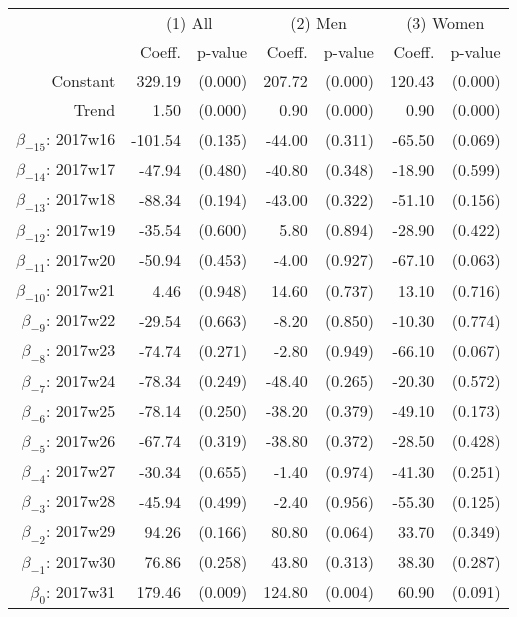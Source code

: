 \begin{threeparttable}
\begin{tabular}{@{}r|rr|rr|rr@{}} \hline\hline
 & \multicolumn{2}{c|}{(1) All} & \multicolumn{2}{c|}{(2) Men} &  \multicolumn{2}{c}{(3) Women} \\ 
 & Coeff. & p-value  & Coeff. & p-value & Coeff. & p-value \\ \hline
 Constant & 329.19  & (0.000) & 207.72  & (0.000)  & 120.43  & (0.000) \\ 
 Trend &  1.50  & (0.000) &  0.90  & (0.000)  &  0.90  & (0.000) \\ 
 $ \beta_{-15} $: 2017w16 & -101.54  & (0.135) & -44.00  & (0.311)  & -65.50  & (0.069) \\ 
 $ \beta_{-14} $: 2017w17 & -47.94  & (0.480) & -40.80  & (0.348)  & -18.90  & (0.599) \\ 
 $ \beta_{-13} $: 2017w18 & -88.34  & (0.194) & -43.00  & (0.322)  & -51.10  & (0.156) \\ 
 $ \beta_{-12} $: 2017w19 & -35.54  & (0.600) &  5.80  & (0.894)  & -28.90  & (0.422) \\ 
 $ \beta_{-11} $: 2017w20 & -50.94  & (0.453) & -4.00  & (0.927)  & -67.10  & (0.063) \\ 
 $ \beta_{-10} $: 2017w21 &  4.46  & (0.948) & 14.60  & (0.737)  & 13.10  & (0.716) \\ 
 $ \beta_{-9} $: 2017w22 & -29.54  & (0.663) & -8.20  & (0.850)  & -10.30  & (0.774) \\ 
 $ \beta_{-8} $: 2017w23 & -74.74  & (0.271) & -2.80  & (0.949)  & -66.10  & (0.067) \\ 
 $ \beta_{-7} $: 2017w24 & -78.34  & (0.249) & -48.40  & (0.265)  & -20.30  & (0.572) \\ 
 $ \beta_{-6} $: 2017w25 & -78.14  & (0.250) & -38.20  & (0.379)  & -49.10  & (0.173) \\ 
 $ \beta_{-5} $: 2017w26 & -67.74  & (0.319) & -38.80  & (0.372)  & -28.50  & (0.428) \\ 
 $ \beta_{-4} $: 2017w27 & -30.34  & (0.655) & -1.40  & (0.974)  & -41.30  & (0.251) \\ 
 $ \beta_{-3} $: 2017w28 & -45.94  & (0.499) & -2.40  & (0.956)  & -55.30  & (0.125) \\ 
 $ \beta_{-2} $: 2017w29 & 94.26  & (0.166) & 80.80  & (0.064)  & 33.70  & (0.349) \\ 
 $ \beta_{-1} $: 2017w30 & 76.86  & (0.258) & 43.80  & (0.313)  & 38.30  & (0.287) \\ 
 $ \beta_{0} $: 2017w31 & 179.46  & (0.009) & 124.80  & (0.004)  & 60.90  & (0.091) \\ 

\end{tabular}
\end{threeparttable}
